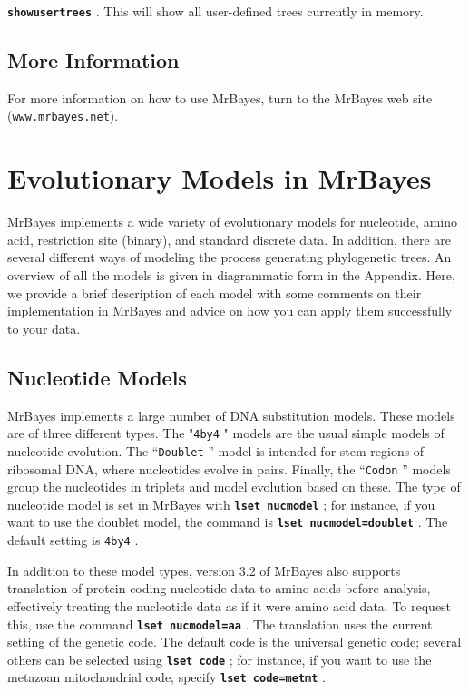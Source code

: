 \documentclass[12pt]{book}
\newcommand{\ttt}[1]{\texttt{#1} }
\newcommand{\tb}[1]{\texttt{\textbf{#1}} }
\begin{document}
\tb{showusertrees}. This will show all user-defined trees currently in memory.

\section{More Information}
For more information on how to use MrBayes, turn to the MrBayes web site
(\texttt{www.mrbayes.net}).


\chapter{Evolutionary Models in MrBayes}
\label{evolutionaryModels}

MrBayes implements a wide variety of evolutionary models for nucleotide, amino acid, restriction
site (binary), and standard discrete data. In addition, there are several different ways of
modeling the process generating phylogenetic trees. An overview of all the models is given in
diagrammatic form in the Appendix. Here, we provide a brief description of each model with some
comments on their implementation in MrBayes and advice on how you can apply them successfully to
your data.

\section{Nucleotide Models}
MrBayes implements a large number of DNA substitution models. These models are of three different
types. The "\ttt{4by4}" models are the usual simple models of nucleotide evolution. The
``\ttt{Doublet}'' model is intended for stem regions of ribosomal DNA, where nucleotides evolve in
pairs. Finally, the ``\ttt{Codon}'' models group the nucleotides in triplets and model evolution
based on these. The type of nucleotide model is set in MrBayes with \tb{lset nucmodel}; for
instance, if you want to use the doublet model, the command is \tb{lset nucmodel=doublet}. The
default setting is \ttt{4by4}.

In addition to these model types, version 3.2 of MrBayes also supports translation of
protein-coding nucleotide data to amino acids before analysis, effectively treating the nucleotide
data as if it were amino acid data. To request this, use the command \tb{lset nucmodel=aa}. The
translation uses the current setting of the genetic code. The default code is the universal genetic
code; several others can be selected using \tb{lset code}; for instance, if you want to use the
metazoan mitochondrial code, specify \tb{lset code=metmt}.
\end{document}

